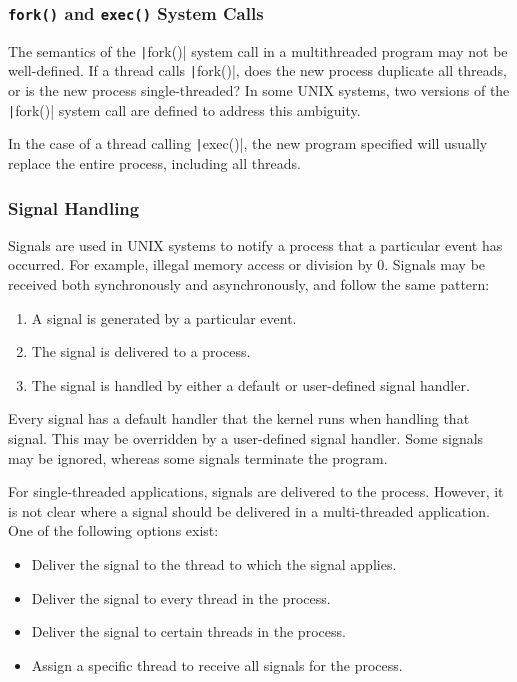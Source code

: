 \documentclass{article}
\begin{document}
\subsubsection{\texttt{fork()} and \texttt{exec()} System Calls}
The semantics of the \texttt|fork()| system call in a
multithreaded program may not be well-defined. If a thread calls
\texttt|fork()|, does the new process duplicate all threads, or
is the new process single-threaded? In some UNIX systems, two versions
of the \texttt|fork()| system call are defined to address this
ambiguity.

In the case of a thread calling \texttt|exec()|, the new program
specified will usually replace the entire process, including all threads.
\subsubsection{Signal Handling}
Signals are used in UNIX systems to notify a process that a particular
event has occurred. For example, illegal memory access or division by
0. Signals may be received both synchronously and asynchronously, and
follow the same pattern:
\begin{enumerate}
    \item A signal is generated by a particular event.
    \item The signal is delivered to a process.
    \item The signal is handled by either a default or user-defined
          signal handler.
\end{enumerate}
Every signal has a default handler that the kernel runs when handling
that signal. This may be overridden by a user-defined signal handler.
Some signals may be ignored, whereas some signals terminate the program.

For single-threaded applications, signals are delivered to the process.
However, it is not clear where a signal should be delivered in a
multi-threaded application. One of the following options exist:
\begin{itemize}
    \item Deliver the signal to the thread to which the signal applies.
    \item Deliver the signal to every thread in the process.
    \item Deliver the signal to certain threads in the process.
    \item Assign a specific thread to receive all signals for the
          process.
\end{itemize}
\end{document}
